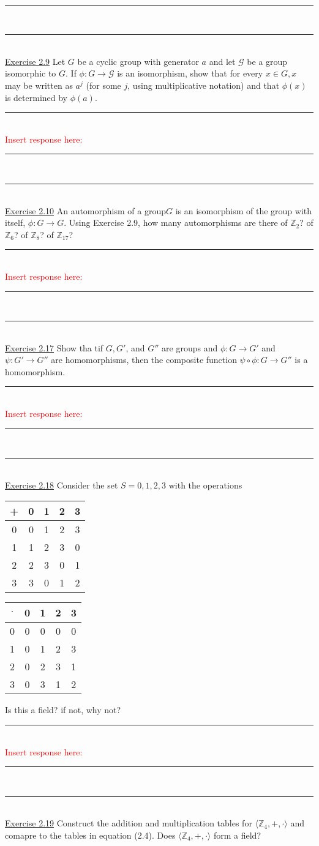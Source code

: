 \documentclass{article}
\newcommand{\problemsep}{\leavevmode\\[0.05in] \rule[\baselineskip/4]{\textwidth}{1pt} \\[0.005in] \rule[\baselineskip]{\textwidth}{1pt}\vspace{-\baselineskip}\leavevmode\\[0.05in]}
\newcommand{\statementsep}{\leavevmode\\[0.005in] \rule[\baselineskip/4]{\textwidth}{0.4pt}\leavevmode\\[0.005in]}
\begin{document}
\problemsep
\noindent\underline{Exercise 2.9}
Let $G$ be a cyclic group with  generator $a$ and let $\mathcal{G}$ be a group isomorphic to $G$. If $\phi : G \rightarrow \mathcal{G}$ is an isomorphism, show that for every $x \in G, x$ may be written as $a^j$ (for some $j$, using multiplicative notation) and that $\phi(x)$ is determined by $\phi(a)$.
\statementsep
\textcolor{red}{Insert response here: }
\problemsep
\noindent\underline{Exercise 2.10}
An automorphism of a group$G$ is an isomorphism of the group with itself, $\phi: G \rightarrow G$. Using Exercise 2.9, how many automorphisms are there of $\mathbb{Z}_2$? of $\mathbb{Z}_6$? of $\mathbb{Z}_8$? of $\mathbb{Z}_{17}$?
\statementsep
\textcolor{red}{Insert response here: }
\problemsep
\noindent\underline{Exercise 2.17}
Show tha tif $G, G'$, and $G''$ are groups and $\phi : G\rightarrow G'$ and $\psi : G' \rightarrow G''$ are homomorphisms, then the composite function $\psi \circ \phi : G \rightarrow G''$ is a homomorphism.
\statementsep
\textcolor{red}{Insert response here: }
\problemsep
\noindent\underline{Exercise 2.18}
Consider the set $S = {0, 1, 2, 3}$ with the operations \\[0.05in]
\begin{center}
\begin{tabular}{c | c c c c}
+ & 0 & 1 & 2 & 3 \\ \hline
0 & 0 & 1 & 2 & 3 \\
1 & 1 & 2 & 3 & 0 \\
2 & 2 & 3 & 0 & 1 \\
3 & 3 & 0 & 1 & 2 \\
\end{tabular} \hspace{0.2in}
\begin{tabular}{c | c c c c}
$\cdot$ & 0 & 1 & 2 & 3 \\ \hline
0       & 0 & 0 & 0 & 0 \\
1       & 0 & 1 & 2 & 3 \\
2       & 0 & 2 & 3 & 1  \\
3       & 0 & 3 & 1 & 2 \\
\end{tabular} 
\end{center}
Is this a field? if not, why not?
\statementsep
\textcolor{red}{Insert response here: }
\problemsep
\noindent\underline{Exercise 2.19}
Construct the addition and multiplication tables for $\langle \mathbb{Z}_4,+,\cdot \rangle$ and comapre to the tables in equation (2.4). Does $\langle \mathbb{Z}_4,+,\cdot \rangle$ form a field?
\end{document}
